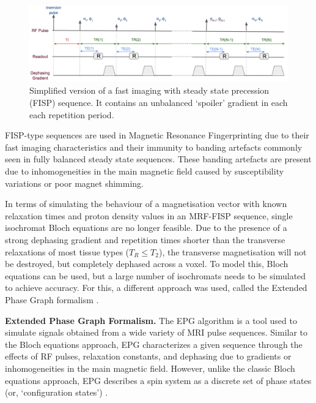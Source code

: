 \begin{figure}[ht]
    \centering
    \includegraphics[angle=0,width=1\textwidth, keepaspectratio]{images/mrf/sequenceFISP}
    \caption{Simplified version of a fast imaging with steady state precession (FISP) sequence. It contains an unbalanced `spoiler' gradient in each each repetition period.}
    \label{fig:sequenceFISP}
\end{figure}

\hfill

FISP-type sequences are used in Magnetic Resonance Fingerprinting due to their fast imaging characteristics and their immunity to banding artefacts commonly seen in fully balanced steady state sequences. 
These banding artefacts are present due to inhomogeneities in the main magnetic field caused by susceptibility variations or poor magnet shimming. 

\hfill

In terms of simulating the behaviour of a magnetisation vector with known relaxation times and proton density values in an MRF-FISP sequence, single isochromat Bloch equations are no longer feasible.
Due to the presence of a strong dephasing gradient and repetition times shorter than the transverse relaxations of most tissue types \big($T_R \leq T_2$\big), the transverse magnetisation will not be destroyed, but completely dephased across a voxel.
To model this, Bloch equations can be used, but a large number of isochromats needs to be simulated to achieve accuracy.
For this, a different approach was used, called the Extended Phase Graph formalism \cite{Hennig1988} \cite{Hennig1991}.

\hfill

\textbf{Extended Phase Graph Formalism.} The EPG algorithm \cite{Hennig1988} \cite{Hennig1991} \cite{Weigel2015} is a tool used to simulate signals obtained from a wide variety of MRI pulse sequences.
Similar to the Bloch equations approach, EPG characterizes a given sequence through the effects of RF pulses, relaxation constants, and dephasing due to gradients or inhomogeneities in the main magnetic field.
However, unlike the classic Bloch equations approach, EPG describes a spin system as a discrete set of phase states (or, `configuration states') \cite{Hennig1988}.

